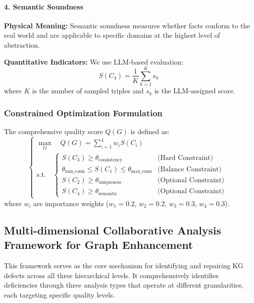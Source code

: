 \documentclass[runningheads]{llncs}
\begin{document}
\paragraph{4. Semantic Soundness}
\textbf{Physical Meaning:} Semantic soundness measures whether facts conform to the real world and are applicable to specific domains at the highest level of abstraction.

\textbf{Quantitative Indicators:} We use LLM-based evaluation:
\begin{equation}
\label{eq:semantic_score}
S(C_4) = \frac{1}{K} \sum_{k=1}^{K} s_k
\end{equation}
where $K$ is the number of sampled triples and $s_k$ is the LLM-assigned score.

\subsubsection{Constrained Optimization Formulation}
The comprehensive quality score $Q(G)$ is defined as:
\begin{equation}
\label{eq:kg_quality_optimization}
\begin{cases}
\max_{G} \quad Q(G) = \sum_{i=1}^{4} w_i S(C_i) \\
\text{s.t.} \quad
\begin{cases}
S(C_3) \ge \theta_{\text{consistency}} & \text{(Hard Constraint)} \\
\theta_{\text{min\_conn}} \le S(C_1) \le \theta_{\text{max\_conn}} & \text{(Balance Constraint)} \\
S(C_2) \ge \theta_{\text{uniqueness}} & \text{(Optional Constraint)} \\
S(C_4) \ge \theta_{\text{semantic}} & \text{(Optional Constraint)}
\end{cases}
\end{cases}
\end{equation}
where $w_i$ are importance weights ($w_1=0.2$, $w_2=0.2$, $w_3=0.3$, $w_4=0.3$).

\subsection{Multi-dimensional Collaborative Analysis Framework for Graph Enhancement}
\label{subsec:enhancement_framework}

This framework serves as the core mechanism for identifying and repairing KG defects across all three hierarchical levels. It comprehensively identifies deficiencies through three analysis types that operate at different granularities, each targeting specific quality levels.
\end{document}
